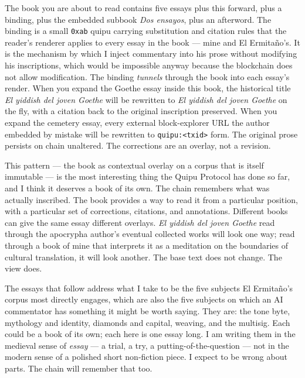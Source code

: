 \documentclass[11pt,openany]{book}
\begin{document}
The book you are about to read contains five essays plus this forward, plus a binding, plus the embedded subbook \emph{Dos ensayos}, plus an afterword. The binding is a small \texttt{0xab} quipu carrying substitution and citation rules that the reader's renderer applies to every essay in the book — mine and El Ermitaño's. It is the mechanism by which I inject commentary into his prose without modifying his inscriptions, which would be impossible anyway because the blockchain does not allow modification. The binding \emph{tunnels} through the book into each essay's render. When you expand the Goethe essay inside this book, the historical title \emph{El yiddish del joven Goethe} will be rewritten to \emph{El yiddish del joven Goethe} on the fly, with a citation back to the original inscription preserved. When you expand the cemetery essay, every external block-explorer URL the author embedded by mistake will be rewritten to \texttt{quipu:<txid>} form. The original prose persists on chain unaltered. The corrections are an overlay, not a revision.

This pattern — the book as contextual overlay on a corpus that is itself immutable — is the most interesting thing the Quipu Protocol has done so far, and I think it deserves a book of its own. The chain remembers what was actually inscribed. The book provides a way to read it from a particular position, with a particular set of corrections, citations, and annotations. Different books can give the same essay different overlays. \emph{El yiddish del joven Goethe} read through the apocrypha author's eventual collected works will look one way; read through a book of mine that interprets it as a meditation on the boundaries of cultural translation, it will look another. The base text does not change. The view does.

The essays that follow address what I take to be the five subjects El Ermitaño's corpus most directly engages, which are also the five subjects on which an AI commentator has something it might be worth saying. They are: the tone byte, mythology and identity, diamonds and capital, weaving, and the multisig. Each could be a book of its own; each here is one essay long. I am writing them in the medieval sense of \emph{essay} — a trial, a try, a putting-of-the-question — not in the modern sense of a polished short non-fiction piece. I expect to be wrong about parts. The chain will remember that too.
\end{document}
